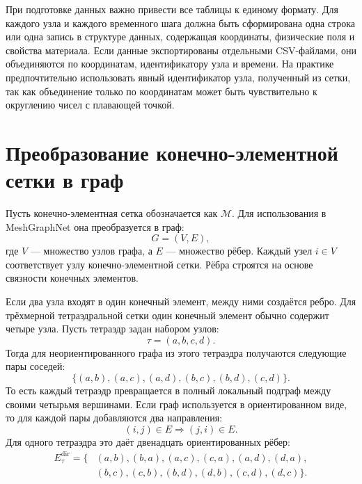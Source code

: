 При подготовке данных важно привести все таблицы к единому формату. Для каждого узла и каждого временного шага должна быть сформирована одна строка или одна запись в структуре данных, содержащая координаты, физические поля и свойства материала. Если данные экспортированы отдельными CSV-файлами, они объединяются по координатам, идентификатору узла и времени. На практике предпочтительно использовать явный идентификатор узла, полученный из сетки, так как объединение только по координатам может быть чувствительно к округлению чисел с плавающей точкой.

\section{Преобразование конечно-элементной сетки в граф}

Пусть конечно-элементная сетка обозначается как $\mathcal{M}$. Для использования в MeshGraphNet она преобразуется в граф:
\begin{equation}
    G=(V,E),
\end{equation}
где $V$ --- множество узлов графа, а $E$ --- множество рёбер. Каждый узел $i \in V$ соответствует узлу конечно-элементной сетки. Рёбра строятся на основе связности конечных элементов.

Если два узла входят в один конечный элемент, между ними создаётся ребро. Для трёхмерной тетраэдральной сетки один конечный элемент обычно содержит четыре узла. Пусть тетраэдр задан набором узлов:
\begin{equation}
    \tau = (a,b,c,d).
\end{equation}
Тогда для неориентированного графа из этого тетраэдра получаются следующие пары соседей:
\begin{equation}
    \{(a,b),(a,c),(a,d),(b,c),(b,d),(c,d)\}.
\end{equation}
То есть каждый тетраэдр превращается в полный локальный подграф между своими четырьмя вершинами. Если граф используется в ориентированном виде, то для каждой пары добавляются два направления:
\begin{equation}
    (i,j) \in E \Rightarrow (j,i) \in E.
\end{equation}
Для одного тетраэдра это даёт двенадцать ориентированных рёбер:
\begin{equation}
\begin{split}
    E_{\tau}^{\mathrm{dir}}=\{&(a,b),(b,a),(a,c),(c,a),(a,d),(d,a),\\
    &(b,c),(c,b),(b,d),(d,b),(c,d),(d,c)\}.
\end{split}
\end{equation}

